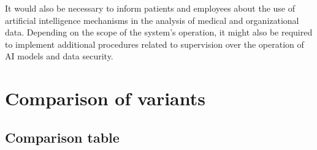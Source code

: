     It would also be necessary to inform patients and employees about the use of artificial intelligence mechanisms in the analysis of medical and organizational data. Depending on the scope of the system's operation, it might also be required to implement additional procedures related to supervision over the operation of AI models and data security.

    \section{Comparison of variants}

    \subsection{Comparison table}

    \renewcommand{\arraystretch}{1.3}

